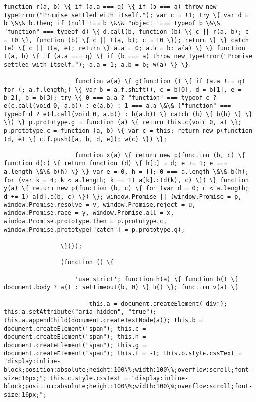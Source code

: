 \documentclass[11pt]{article}
\begin{document}
\begin{Verbatim}[commandchars=\\\{\}]
                    function r(a, b) \{ if (a.a === q) \{ if (b === a) throw new TypeError("Promise settled with itself."); var c = !1; try \{ var d = b \&\& b.then; if (null !== b \&\& "object" === typeof b \&\& "function" === typeof d) \{ d.call(b, function (b) \{ c || r(a, b); c = !0 \}, function (b) \{ c || t(a, b); c = !0 \}); return \} \} catch (e) \{ c || t(a, e); return \} a.a = 0; a.b = b; w(a) \} \} function t(a, b) \{ if (a.a === q) \{ if (b === a) throw new TypeError("Promise settled with itself."); a.a = 1; a.b = b; w(a) \} \}

                    function w(a) \{ g(function () \{ if (a.a !== q) for (; a.f.length;) \{ var b = a.f.shift(), c = b[0], d = b[1], e = b[2], b = b[3]; try \{ 0 === a.a ? "function" === typeof c ? e(c.call(void 0, a.b)) : e(a.b) : 1 === a.a \&\& ("function" === typeof d ? e(d.call(void 0, a.b)) : b(a.b)) \} catch (h) \{ b(h) \} \} \}) \} p.prototype.g = function (a) \{ return this.c(void 0, a) \}; p.prototype.c = function (a, b) \{ var c = this; return new p(function (d, e) \{ c.f.push([a, b, d, e]); w(c) \}) \};

                    function x(a) \{ return new p(function (b, c) \{ function d(c) \{ return function (d) \{ h[c] = d; e += 1; e === a.length \&\& b(h) \} \} var e = 0, h = []; 0 === a.length \&\& b(h); for (var k = 0; k < a.length; k += 1) a[k].c(d(k), c) \}) \} function y(a) \{ return new p(function (b, c) \{ for (var d = 0; d < a.length; d += 1) a[d].c(b, c) \}) \}; window.Promise || (window.Promise = p, window.Promise.resolve = v, window.Promise.reject = u, window.Promise.race = y, window.Promise.all = x, window.Promise.prototype.then = p.prototype.c, window.Promise.prototype["catch"] = p.prototype.g);

                \}());

                (function () \{

                    'use strict'; function h(a) \{ function b() \{ document.body ? a() : setTimeout(b, 0) \} b() \}; function v(a) \{

                        this.a = document.createElement("div"); this.a.setAttribute("aria-hidden", "true"); this.a.appendChild(document.createTextNode(a)); this.b = document.createElement("span"); this.c = document.createElement("span"); this.h = document.createElement("span"); this.g = document.createElement("span"); this.f = -1; this.b.style.cssText = "display:inline-block;position:absolute;height:100\%;width:100\%;overflow:scroll;font-size:16px;"; this.c.style.cssText = "display:inline-block;position:absolute;height:100\%;width:100\%;overflow:scroll;font-size:16px;";


\end{Verbatim}
\end{document}
